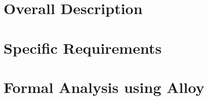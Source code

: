 \documentclass[12pt]{article}
\begin{document}
\newpage
\section{Overall Description}


\newpage
\section{Specific Requirements}



\newpage
\section{Formal Analysis using Alloy} 



\newpage
\end{document}
